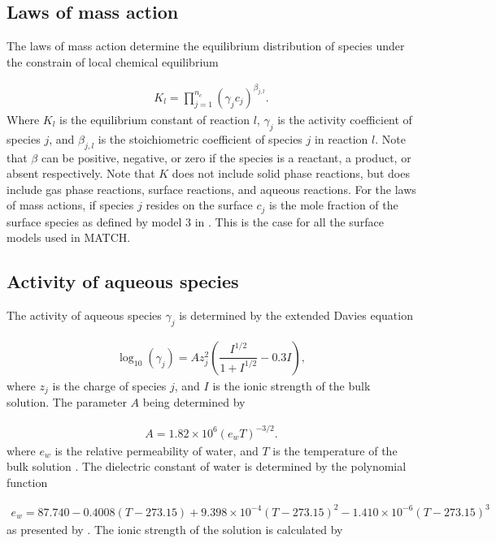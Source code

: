 \documentclass{article}
\begin{document}
\subsection{Laws of mass action}
The laws of mass action determine the equilibrium distribution of species under the constrain of local chemical equilibrium

\begin{align}
K_l = \prod_{j=1}^{n_c} \left(\gamma_j c_j\right)^{\beta_{j,l}}.
\end{align}
Where $K_l$ is the equilibrium constant of reaction $l$, $\gamma_j$ is the activity coefficient of species $j$, and $\beta_{j,l}$ is the stoichiometric coefficient of species $j$ in reaction $l$.  Note that $\beta$ can be positive, negative, or zero if the species is a reactant, a product, or absent respectively. Note that $K$ does not include solid phase reactions, but does include gas phase reactions, surface reactions, and aqueous reactions. For the laws of mass actions, if species $j$ resides on the surface $c_j$ is the mole fraction of the surface species as defined by model 3 in \citet{wang2013}{}. This is the case for all the surface models used in MATCH.

\subsection{Activity of aqueous species}
The activity of aqueous species $\gamma_j$ is determined by the extended Davies equation

\begin{align}
    \log_{10}\left(\gamma_j\right) = A z_j^2\left(\dfrac{I^{1/2}}{1+I^{1/2}} - 0.3I\right),
\end{align}
where $z_j$ is the charge of species $j$, and $I$ is the ionic strength of the bulk solution. The parameter $A$ being determined by

\begin{align}
    A = 1.82\times10^6 \left(e_wT\right)^{-3/2}.
\end{align}
where $e_w$ is the relative permeability of water, and $T$ is the temperature of the bulk solution \cite{Davies1962}{}. The dielectric constant of water is determined by the polynomial function

\begin{align}
    e_w = 87.740 - 0.4008(T-273.15) + 9.398\times10^{-4}(T-273.15)^2 - 1.410\times10^{-6}(T-273.15)^3
\end{align}
as presented by \citet{malmberg1956dielectric}{}.
The ionic strength of the solution is calculated by
\end{document}
